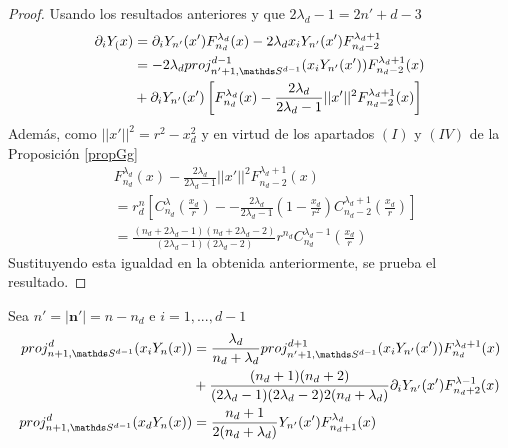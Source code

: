 \begin{proof} Usando los resultados anteriores y que $2\lambda_d-1 = 2n'+d-3$
	$$
	\begin{aligned}\partial_i Y_(x) &= \partial_i Y_{n'}(x')F_{n_d}^{\lambda_d}(x)-2\lambda_d x_i Y_{n'}(x')F_{n_d-2}^{\lambda_d+1}\\ &= -2\lambda_d proj_{n'+1,\sphere}^{d-1}(x_iY_{n'}(x'))F_{n_d-2}^{\lambda_d+1}(x)\\ &+ \partial_iY_{n'}(x')\left[F_{n_d}^{\lambda_d}(x)-\frac{2\lambda_d}{2\lambda_d-1}||x'||^2F_{n_d-2}^{\lambda_d+1}(x)\right]\end{aligned}$$
	Además, como $||x'||^2 = r^2-x_d^2$ y en virtud de los apartados $(I)$ y $(IV)$ de la Proposición \ref{propGg}
	$$\begin{aligned}
	&F_{n_d}^{\lambda_d}(x) -\frac{2\lambda_d}{2\lambda_d-1}||x'||^2F_{n_d-2}^{\lambda_d+1}(x) \\&=  r^n_d\left[C_{n_d}^{\lambda}(\frac{x_d}{r}) - -\frac{2\lambda_d}{2\lambda_d-1}(1-\frac{x_d}{r^2})C_{n_d-2}^{\lambda_d+1}(\frac{x_d}{r})\right] \\ &=   \frac{(n_d+2\lambda_d-1)(n_d+2\lambda_d-2)}{(2\lambda_d-1)(2\lambda_d - 2)}r^{n_d}C_{n_d}^{\lambda_d-1}(\frac{x_d}{r})
	\end{aligned}
	$$
	Sustituyendo esta igualdad en la obtenida anteriormente, se prueba el resultado.
\end{proof}
\begin{prop}Sea $n'=|\textbf{n}'|=n-n_d$ e $i=1,...,d-1$
	\begin{gather*}
	\begin{aligned}
		proj_{n+1,\sphere}^d(x_iY_n(x)) &= \frac{\lambda_d}{n_d+\lambda_d} proj_{n'+1,\sphere}^{d+1}(x_iY_{n'}(x'))F_{n_d}^{\lambda_d +1}(x)\\&+ \frac{(n_d+1)(n_d+2)}{(2\lambda_d-1)(2\lambda_d-2)2(n_d+\lambda_d)}\partial_iY_{n'}(x')F_{n_d+2}^{\lambda-1}(x)\\
		proj_{n+1,\sphere}^d(x_dY_n(x)) &= \frac{n_d+1}{2(n_d+\lambda_d)}Y_{n'}(x')F_{n_d+1}^{\lambda_d}(x)
	\end{aligned}
	\end{gather*}
\end{prop}
